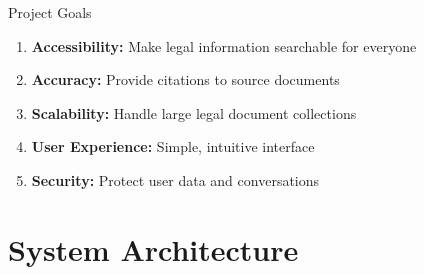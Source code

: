 \documentclass[11pt,aspectratio=16:9]{beamer}
\begin{document}
\begin{frame}{Project Goals}
    \begin{enumerate}
        \item \textbf{Accessibility:} Make legal information searchable for everyone
        \item \textbf{Accuracy:} Provide citations to source documents
        \item \textbf{Scalability:} Handle large legal document collections
        \item \textbf{User Experience:} Simple, intuitive interface
        \item \textbf{Security:} Protect user data and conversations
    \end{enumerate}
    
    \vspace{0.8cm}
    
    \begin{center}
    \end{center}
\end{frame}

\section{System Architecture}
\end{document}
